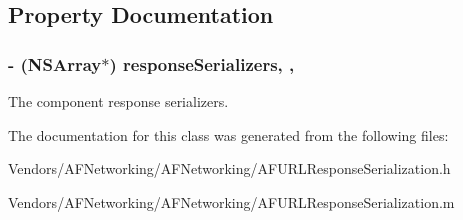 \subsection{Property Documentation}
\hypertarget{interface_a_f_compound_response_serializer_a909fdc29d0b342748bac1f925390c0bc}{}
\subsubsection[{response\+Serializers}]{\setlength{\rightskip}{0pt plus 5cm}-\/ (N\+S\+Array$\ast$) response\+Serializers\hspace{0.3cm}{\ttfamily [read]}, {\ttfamily [nonatomic]}, {\ttfamily [copy]}}\label{interface_a_f_compound_response_serializer_a909fdc29d0b342748bac1f925390c0bc}
The component response serializers. 

The documentation for this class was generated from the following files\+:\begin{DoxyCompactItemize}
\item 
Vendors/\+A\+F\+Networking/\+A\+F\+Networking/A\+F\+U\+R\+L\+Response\+Serialization.\+h\item 
Vendors/\+A\+F\+Networking/\+A\+F\+Networking/A\+F\+U\+R\+L\+Response\+Serialization.\+m\end{DoxyCompactItemize}
